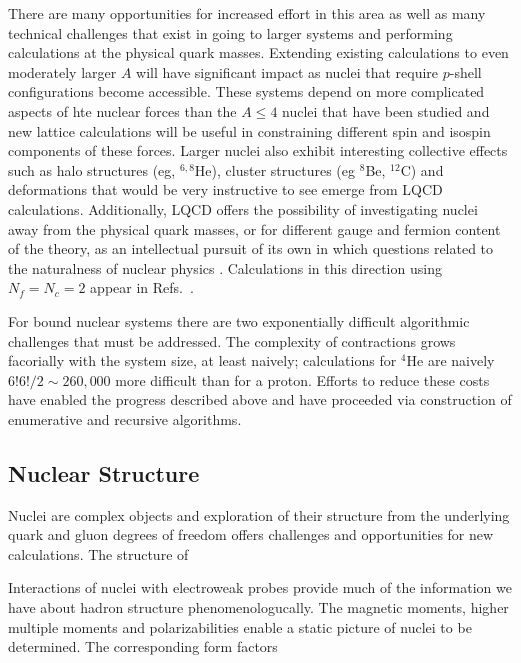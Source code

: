 There are many opportunities for increased effort in this area as well as many technical challenges that exist in going to larger systems and performing calculations at the physical quark masses. 
Extending existing calculations to even moderately larger $A$ will have significant impact as nuclei that require $p$-shell configurations become accessible. These systems depend on more complicated aspects of hte nuclear forces than the $A\le4$ nuclei that have been studied and new lattice calculations will be useful in constraining different spin and isospin components of these forces. Larger nuclei also exhibit interesting collective effects such as halo structures (eg,  ${}^{6,8}$He), cluster structures (eg ${}^{8}$Be, ${}^{12}$C) and deformations that would be very instructive to see emerge from LQCD calculations. Additionally, LQCD offers the possibility of investigating nuclei away from the physical quark masses, or for different gauge and fermion content of the theory, as an intellectual pursuit of its own in which questions related to the naturalness of nuclear physics \cite{Orginos:2015aya}. Calculations in this direction using $N_f=N_c=2$ appear in Refs.~\cite{Detmold:2014qqa,Detmold:2014kba}.

For bound nuclear systems there are two exponentially difficult algorithmic challenges that must be addressed. The complexity of contractions grows 
facorially with the system size, at least naively; calculations for $^4$He are naively $6!6!/2\sim 260,000$ more difficult than for a proton. Efforts to reduce these costs have enabled the progress described above and have proceeded via construction of enumerative \cite{Doi:2012xd,Gunther:2013xj} and recursive \cite{Detmold:2012eu} algorithms. 


\subsection{Nuclear Structure}
\label{sec:nuclearstructure}

Nuclei are complex objects and exploration of their structure from the underlying quark and gluon degrees of freedom offers challenges and opportunities for new calculations. The structure of 


Interactions of nuclei with electroweak probes provide much of the information we have about hadron structure phenomenologucally. 
The magnetic moments,  higher multiple moments and polarizabilities  enable a static picture of nuclei to be determined. The corresponding form factors 

